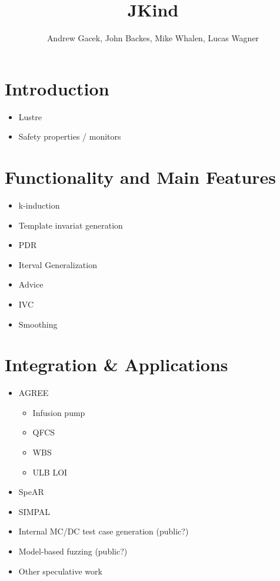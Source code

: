 \documentclass{article}
\title{JKind}
\author{Andrew Gacek, John Backes, Mike Whalen, Lucas Wagner}
\begin{document}
\maketitle

\section{Introduction}

\begin{itemize}
\item Lustre
\item Safety properties / monitors
\end{itemize}

\section{Functionality and Main Features}

\begin{itemize}
\item k-induction
\item Template invariat generation
\item PDR
\item Iterval Generalization
\item Advice
\item IVC
\item Smoothing
\end{itemize}

\section{Integration \& Applications}

\begin{itemize}
\item AGREE
  \begin{itemize}
  \item Infusion pump
  \item QFCS
  \item WBS
  \item ULB LOI
  \end{itemize}
\item SpeAR~\cite{fifarek2017nfm}
\item SIMPAL~\cite{wagner2017spin}
\item Internal MC/DC test case generation (public?)
\item Model-based fuzzing (public?)
\item Other speculative work
\end{itemize}
\end{document}
